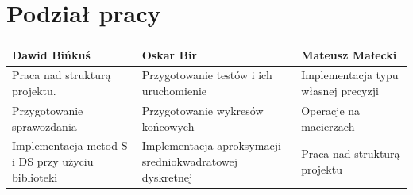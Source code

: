 \documentclass[10pt]{article}
\begin{document}
\section{Podział pracy}
\centering
\begin{tabular}{| p{4.4cm} | p{4.4cm} | p{4.4cm} |}
	\hline
	\textbf{Dawid Bińkuś} & \textbf{Oskar Bir} & \textbf{Mateusz Małecki} \\ \hline
	Praca nad strukturą projektu. & Przygotowanie testów i ich uruchomienie & Implementacja typu własnej precyzji \\ \hline
	Przygotowanie sprawozdania & Przygotowanie wykresów końcowych & Operacje na macierzach\\ \hline
	Implementacja metod S i DS przy użyciu biblioteki & Implementacja aproksymacji sredniokwadratowej dyskretnej & Praca nad strukturą projektu \\ \hline	
	\end{tabular}
\end{document}
